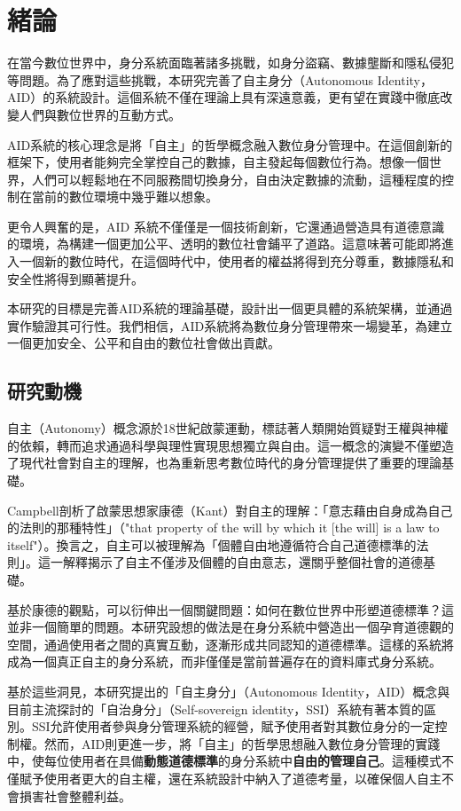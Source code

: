 
\chapter{緒論}
在當今數位世界中，身分系統面臨著諸多挑戰，如身分盜竊、數據壟斷和隱私侵犯等問題。為了應對這些挑戰，本研究完善了自主身分（Autonomous Identity，AID）的系統設計。這個系統不僅在理論上具有深遠意義，更有望在實踐中徹底改變人們與數位世界的互動方式。

AID系統的核心理念是將「自主」的哲學概念融入數位身分管理中。在這個創新的框架下，使用者能夠完全掌控自己的數據，自主發起每個數位行為。想像一個世界，人們可以輕鬆地在不同服務間切換身分，自由決定數據的流動，這種程度的控制在當前的數位環境中幾乎難以想象。

更令人興奮的是，AID 系統不僅僅是一個技術創新，它還通過營造具有道德意識的環境，為構建一個更加公平、透明的數位社會鋪平了道路。這意味著可能即將進入一個新的數位時代，在這個時代中，使用者的權益將得到充分尊重，數據隱私和安全性將得到顯著提升。

本研究的目標是完善AID系統的理論基礎，設計出一個更具體的系統架構，並通過實作驗證其可行性。我們相信，AID系統將為數位身分管理帶來一場變革，為建立一個更加安全、公平和自由的數位社會做出貢獻。
\section{研究動機}
自主（Autonomy）概念源於18世紀啟蒙運動，標誌著人類開始質疑對王權與神權的依賴，轉而追求通過科學與理性實現思想獨立與自由。這一概念的演變不僅塑造了現代社會對自主的理解，也為重新思考數位時代的身分管理提供了重要的理論基礎。

Campbell\cite{CAMPBELL2017381}剖析了啟蒙思想家康德（Kant）對自主的理解：「意志藉由自身成為自己的法則的那種特性」（"that property of the will by which it [the will] is a law to itself"）。換言之，自主可以被理解為「個體自由地遵循符合自己道德標準的法則」。這一解釋揭示了自主不僅涉及個體的自由意志，還關乎整個社會的道德基礎。

基於康德的觀點，可以衍伸出一個關鍵問題：如何在數位世界中形塑道德標準？這並非一個簡單的問題。本研究設想的做法是在身分系統中營造出一個孕育道德觀的空間，通過使用者之間的真實互動，逐漸形成共同認知的道德標準。這樣的系統將成為一個真正自主的身分系統，而非僅僅是當前普遍存在的資料庫式身分系統。

基於這些洞見，本研究提出的「自主身分」（Autonomous Identity，AID）概念與目前主流探討的「自治身分」（Self-sovereign identity，SSI）系統有著本質的區別。SSI允許使用者參與身分管理系統的經營，賦予使用者對其數位身分的一定控制權。然而，AID則更進一步，將「自主」的哲學思想融入數位身分管理的實踐中，使每位使用者在具備\textbf{動態道德標準}的身分系統中\textbf{自由的管理自己}。這種模式不僅賦予使用者更大的自主權，還在系統設計中納入了道德考量，以確保個人自主不會損害社會整體利益。
